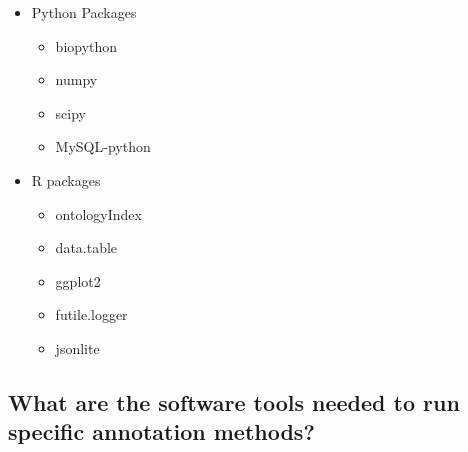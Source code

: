 \begin{itemize}
 \item Python Packages
 \begin{itemize}
  \item biopython
  \item numpy
  \item scipy
  \item MySQL-python
 \end{itemize}

 \item R packages
 \begin{itemize}
  \item ontologyIndex
  \item data.table
  \item ggplot2
  \item futile.logger
  \item jsonlite
 \end{itemize}

\end{itemize}


\subsection{What are the software tools needed to run specific annotation methods?}

